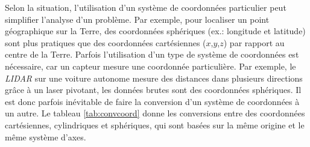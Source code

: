 Selon la situation, l'utilisation d'un système de coordonnées particulier peut simplifier l'analyse d'un problème. Par exemple, pour localiser un point géographique sur la Terre, des coordonnées sphériques (ex.: longitude et latitude) sont plus pratiques que des coordonnées cartésiennes ($x$,$y$,$z$) par rapport au centre de la Terre. Parfois l'utilisation d'un type de système de coordonnées est nécessaire, car un capteur mesure une coordonnée particulière. Par exemple, le \textit{LIDAR} sur une voiture autonome mesure des distances dans plusieurs directions grâce à un laser pivotant, les données brutes sont des coordonnées sphériques. Il est donc parfois inévitable de faire la conversion d'un système de coordonnées à un autre. Le tableau \ref{tab:convcoord} donne les conversions entre des coordonnées cartésiennes, cylindriques et sphériques, qui sont basées sur la même origine et le même système d'axes.
